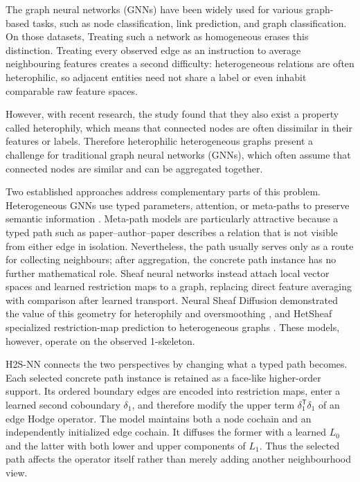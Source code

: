 \documentclass{article}
\newcommand{\method}{\textsc{H2S-NN}}
\newcommand{\transpose}{\mathsf{T}}
\begin{document}
The graph neural networks (GNNs) have been widely used for various graph-based tasks, such as node classification, link prediction, and graph classification.
On those datasets, Treating such a network as homogeneous erases this
distinction. Treating every observed edge as an instruction to average neighbouring features
creates a second difficulty: heterogeneous relations are often heterophilic, so adjacent entities
need not share a label or even inhabit comparable raw feature spaces.

However, with recent research, the study found that they also exist a property called heterophily, which means that connected nodes are often dissimilar in their features or labels.
Therefore heterophilic heterogeneous graphs present a challenge for traditional graph neural networks (GNNs), which often assume that connected nodes are similar and can be aggregated together.


Two established approaches address complementary parts of this problem. Heterogeneous GNNs use
typed parameters, attention, or meta-paths to preserve semantic information
\citep{wang2019han,fu2020magnn,hu2020hgt}. Meta-path models are particularly attractive because a
typed path such as paper--author--paper describes a relation that is not visible from either edge in
isolation. Nevertheless, the path usually serves only as a route for collecting neighbours; after
aggregation, the concrete path instance has no further mathematical role. Sheaf neural networks
instead attach local vector spaces and learned restriction maps to a graph, replacing direct
feature averaging with comparison after learned transport. Neural Sheaf Diffusion demonstrated
the value of this geometry for heterophily and oversmoothing \citep{bodnar2022neural}, and HetSheaf
specialized restriction-map prediction to heterogeneous graphs \citep{braithwaite2024hetsheaf}.
These models, however, operate on the observed 1-skeleton.

\method{} connects the two perspectives by changing what a typed path becomes. Each selected
concrete path instance is retained as a face-like higher-order support. Its ordered boundary edges
are encoded into restriction maps, enter a learned second coboundary $\delta_1$, and therefore
modify the upper term $\delta_1^{\transpose}\delta_1$ of an edge Hodge operator. The model maintains
both a node cochain and an independently initialized edge cochain. It diffuses the former with a
learned $L_0$ and the latter with both lower and upper components of $L_1$. Thus the selected path
affects the operator itself rather than merely adding another neighbourhood view.
\end{document}
